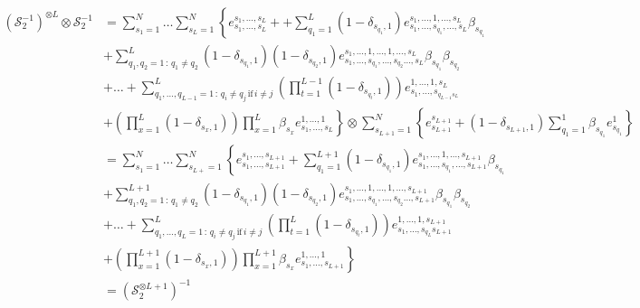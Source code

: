 \documentclass[11pt]{article}
\numberwithin{equation}{section}
\numberwithin{equation}{subsection}
\begin{document}
\begin{align*}
    	\left(\mathcal{S}_{2}^{-1}\right)^{\otimes L}\otimes \mathcal{S}_{2}^{-1}&=\sum_{s_{1}=1}^{N}\ldots\sum_{s_{L}=1}^{N}\left\{e_{s_{1},\ldots,s_{L}}^{s_{1},\ldots,s_{L}}++\sum_{q_{1}=1}^{L}(1-\delta_{s_{q_{1}},1})e_{s_{1},\ldots,s_{q_{1}},\ldots,s_{L}}^{s_{1},\ldots,1,\ldots,s_{L}}\beta_{s_{q_{1}}}\right. 
    	\\&+\left. \sum_{q_{1},q_{2}=1\,:\,q_{1}\neq q_{2}}^{L}(1-\delta_{s_{q_{1}},1})(1-\delta_{s_{q_{2}},1})e_{s_{1},\ldots,s_{q_{1}},\ldots,s_{q_{2}}\ldots,s_{L}}^{s_{1},\ldots,1,\ldots,1,\ldots,s_{L}}\beta_{s_{q_{1}}}\beta_{s_{q_{2}}}\right.
    	\\&+\left.
    	\ldots+	\sum_{q_{1},\ldots,q_{L-1}=1\,:\,q_{i}\neq q_{j}\,\text{if}\,i\neq j}^{L}\left(\prod_{t=1}^{L-1}(1-\delta_{s_{q_{t}},1})\right)e_{s_{1},\ldots,s_{q_{L-1}s_{L}}}^{1,\ldots,1,s_{L}}
    	\right. \\&+ \left. 
    	\left(\prod_{x=1}^{L}(1-\delta_{s_{x},1})\right)\prod_{x=1}^{L}\beta_{s_{x}}e_{s_{1},\ldots,s_{L}}^{1,\ldots,1} \right\}\otimes \sum_{s_{L+1}=1}^{N}\left\{e_{s_{L+1}}^{s_{L+1}}+(1-\delta_{s_{L+1},1})\sum_{q_{1}=1}^{1}\beta_{s_{q_{1}}}e_{s_{q_{1}}}^{1}\right\}
    	\\&=
    	\sum_{s_{1}=1}^{N}\ldots\sum_{s_{L+}=1}^{N}\left\{e_{s_{1},\ldots,s_{L+1}}^{s_{1},\ldots,s_{L+1}}+\sum_{q_{1}=1}^{L+1}(1-\delta_{s_{q_{1}},1})e_{s_{1},\ldots,s_{q_{1}},\ldots,s_{L+1}}^{s_{1},\ldots,1,\ldots,s_{L+1}}\beta_{s_{q_{1}}}\right. 
    	\\&+\left. \sum_{q_{1},q_{2}=1\,:\,q_{1}\neq q_{2}}^{L+1}(1-\delta_{s_{q_{1}},1})(1-\delta_{s_{q_{2}},1})e_{s_{1},\ldots,s_{q_{1}},\ldots,s_{q_{2}}\ldots,s_{L+1}}^{s_{1},\ldots,1,\ldots,1,\ldots,s_{L+1}}\beta_{s_{q_{1}}}\beta_{s_{q_{2}}}\right.
    	\\&+\left.
    	\ldots+	\sum_{q_{1},\ldots,q_{L}=1\,:\,q_{i}\neq q_{j}\,\text{if}\,i\neq j}^{L}\left(\prod_{t=1}^{L}(1-\delta_{s_{q_{t}},1})\right)e_{s_{1},\ldots,s_{q_{L}}s_{L+1}}^{1,\ldots,1,s_{L+1}}
    	\right. \\&+ \left. 
    	\left(\prod_{x=1}^{L+1}(1-\delta_{s_{x},1})\right)\prod_{x=1}^{L+1}\beta_{s_{x}}e_{s_{1},\ldots,s_{L+1}}^{1,\ldots,1} \right\}
    	\\&=
    	\left(\mathcal{S}_{2}^{\otimes L+1}\right)^{-1}
\end{align*}
\end{document}
